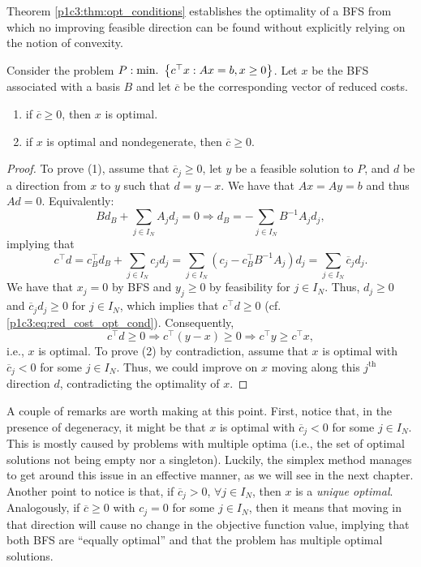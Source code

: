 Theorem \ref{p1c3:thm:opt_conditions} establishes the optimality of a BFS from which no improving feasible direction can be found without explicitly relying on the notion of convexity.

\begin{theorem}\label{p1c3:thm:opt_conditions}
	Consider the problem $P : \mathop{\text{min.~}}\left\{ c^\top x : Ax = b, x \geq 0 \right \}$. Let $x$ be the BFS associated with a basis $B$ and let $\overline{c}$ be the corresponding vector of reduced costs.
	\begin{enumerate}
		\item[(1)] if $\overline{c} \geq 0$, then $x$ is optimal.
		\item[(2)] if $x$ is optimal and nondegenerate, then $\overline{c} \geq 0$.	
	\end{enumerate}
\end{theorem}

\begin{proof}
To prove (1), assume that $\overline{c}_j \geq 0$, let $y$ be a feasible solution to $P$, and $d$ be a direction from $x$ to $y$ such that $d = y - x$. We have that $Ax = Ay = b$ and thus $Ad = 0$. Equivalently:
%
\begin{equation*}
	B d_B + \sum_{j \in I_N}A_j d_j = 0 \Rightarrow d_B = - \sum_{j \in I_N}B^{-1}A_jd_j,
\end{equation*}
%	
implying that	
%
\begin{equation} \label{p1c3:eq:red_cost_opt_cond}
	c^\top d = c_B^\top d_B + \sum_{j \in I_N}c_jd_j= \sum_{j \in I_N} (c_j - c_B^\top B^{-1}A_j)d_j = \sum_{j \in I_N}\overline{c}_jd_j. 
\end{equation}
%
We have that $x_j = 0$ by BFS and $y_j \geq 0$ by feasibility for $j \in I_N$. Thus, $d_j \geq 0$ and $\overline{c}_jd_j \geq 0$ for $j \in I_N$, which implies that $c^\top d \geq 0$ (cf. \eqref{p1c3:eq:red_cost_opt_cond}). Consequently,
%
\begin{equation*}
	c^\top d \geq 0 \Rightarrow	c^\top (y - x) \geq 0 \Rightarrow c^\top y \geq c^\top x,
\end{equation*}
%
i.e., $x$ is optimal. To prove (2) by contradiction, assume that $x$ is optimal with $\overline{c}_j < 0$ for some $j \in I_N$. Thus, we could improve on $x$ moving along this $j^\text{th}$ direction $d$, contradicting the optimality of $x$.
\end{proof}

A couple of remarks are worth making at this point. First, notice that, in the presence of degeneracy, it might be that $x$ is optimal with $\overline{c}_j < 0$ for some $j \in I_N$. This is mostly caused by problems with multiple optima (i.e., the set of optimal solutions not being empty nor a singleton). Luckily, the simplex method manages to get around this issue in an effective manner, as we will see in the next chapter. Another point to notice is that, if $\overline{c}_j > 0$, $\forall j \in I_N$, then $x$ is a \emph{unique optimal}. Analogously, if $\overline{c} \geq 0$ with $c_j =0$ for some $j \in I_N$, then it means that moving in that direction will cause no change in the objective function value, implying that both BFS are ``equally optimal'' and that the problem has multiple optimal solutions. 

